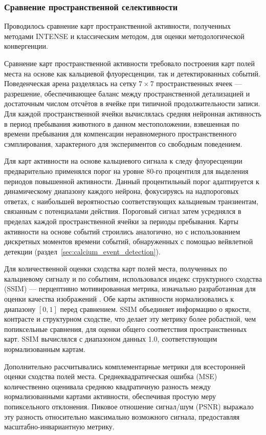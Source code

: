 \subsubsection{Сравнение пространственной селективности}
\label{sec:comparison_spatial_selectivity}

Проводилось сравнение карт пространственной активности, полученных методами INTENSE и классическим методом,
для оценки методологической конвергенции.

Сравнение карт пространственной активности требовало построения карт полей места
на основе как кальциевой флуоресценции, так и детектированных событий. Поведенческая
арена разделялась на сетку $7 \times 7$ пространственных ячеек --- разрешение, обеспечивающее баланс между пространственной
детализацией и достаточным числом отсчётов в ячейке при типичной продолжительности записи. Для каждой
пространственной ячейки вычислялась средняя нейронная активность в период пребывания животного в данном
местоположении, взвешенная по времени пребывания для компенсации неравномерного пространственного сэмплирования,
характерного для экспериментов со свободным поведением.

Для карт активности на основе кальциевого сигнала к следу флуоресценции предварительно применялся порог на уровне 80-го процентиля
для выделения периодов повышенной активности. Данный процентильный
порог адаптируется к динамическому диапазону каждого нейрона, фокусируясь на
надпороговых ответах, с наибольшей вероятностью соответствующих кальциевым
транзиентам, связанным с потенциалами действия. Пороговый сигнал затем усреднялся в пределах каждой пространственной ячейки за периоды пребывания. Карты активности на основе событий строились аналогично, но с использованием
дискретных моментов времени событий, обнаруженных с помощью вейвлетной детекции
(раздел~\ref{sec:calcium_event_detection}).

Для количественной оценки сходства карт полей места, полученных по кальциевому сигналу и по событиям, использовался
индекс структурного сходства (SSIM) --- перцептивно мотивированная метрика, изначально
разработанная для оценки качества изображений \cite{Wang2004ssim}. Обе карты активности
нормализовались к диапазону $[0, 1]$ перед сравнением. SSIM объединяет информацию
о яркости, контрасте и структурном сходстве, что делает эту метрику более робастной, чем
попиксельные сравнения, для оценки общего соответствия пространственных
карт. SSIM вычислялся с диапазоном данных 1.0, соответствующим нормализованным картам.

Дополнительно рассчитывались комплементарные метрики для всесторонней
оценки сходства полей места. Среднеквадратическая ошибка (MSE) количественно оценивала
среднюю квадратичную разность между нормализованными картами активности, обеспечивая
простую меру попиксельного отклонения. Пиковое отношение сигнал/шум
(PSNR) выражало эту разность относительно максимально возможного сигнала, предоставляя
масштабно-инвариантную метрику.

